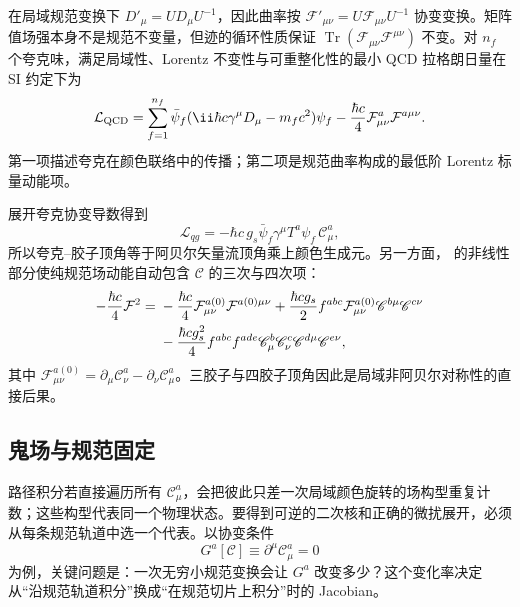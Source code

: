 在局域规范变换下 $D'_\mu=UD_\mu U^{-1}$，因此曲率按 $\mathcal F'_{\mu\nu}=U\mathcal F_{\mu\nu}U^{-1}$ 协变变换。矩阵值场强本身不是规范不变量，但迹的循环性质保证 $\operatorname{Tr}(\mathcal F_{\mu\nu}\mathcal F^{\mu\nu})$ 不变。对 $n_f$ 个夸克味，满足局域性、Lorentz 不变性与可重整化性的最小 QCD 拉格朗日量在 SI 约定下为
\begin{equation}
{
\mathcal L_{\rm QCD}
=\sum_{f=1}^{n_f}\bar\psi_f(\ii\hbar c\gamma^\mu D_\mu-m_fc^2)\psi_f
-\frac{\hbar c}{4}\mathcal F_{\mu\nu}^a\mathcal F^{a\mu\nu}.}
\label{eq:qcd-lagrangian-si-dp10}
\end{equation}
第一项描述夸克在颜色联络中的传播；第二项是规范曲率构成的最低阶 Lorentz 标量动能项。

展开夸克协变导数得到
\begin{equation}
\mathcal L_{qg}
=-\hbar c\,g_s\bar\psi_f\gamma^\mu T^a\psi_f\,\mathscr C_\mu^a,
\label{eq:qcd-quark-gluon-interaction-dp10}
\end{equation}
所以夸克--胶子顶角等于阿贝尔矢量流顶角乘上颜色生成元。另一方面， 的非线性部分使纯规范场动能自动包含 $\mathscr C$ 的三次与四次项：
\begin{align}
-\frac{\hbar c}{4}\mathcal F^2
={}&-\frac{\hbar c}{4}\mathcal F_{\mu\nu}^{a(0)}\mathcal F^{a(0)\mu\nu}
+\frac{\hbar c g_s}{2}f^{abc}\mathcal F_{\mu\nu}^{a(0)}\mathscr C^{b\mu}\mathscr C^{c\nu}\notag\\
&-\frac{\hbar c g_s^2}{4}f^{abc}f^{ade}
\mathscr C_\mu^b\mathscr C_\nu^c\mathscr C^{d\mu}\mathscr C^{e\nu},
\label{eq:yang-mills-expanded-3-4-gluon-dp10}
\end{align}
其中 $\mathcal F_{\mu\nu}^{a(0)}=\partial_\mu\mathscr C_\nu^a-\partial_\nu\mathscr C_\mu^a$。三胶子与四胶子顶角因此是局域非阿贝尔对称性的直接后果。



\subsection{鬼场与规范固定}

路径积分若直接遍历所有 $\mathscr C_\mu^a$，会把彼此只差一次局域颜色旋转的场构型重复计数；这些构型代表同一个物理状态。要得到可逆的二次核和正确的微扰展开，必须从每条规范轨道中选一个代表。以协变条件
\begin{equation*}
 G^a[\mathscr C]\equiv\partial^\mu\mathscr C_\mu^a=0
\end{equation*}
为例，关键问题是：一次无穷小规范变换会让 $G^a$ 改变多少？这个变化率决定从“沿规范轨道积分”换成“在规范切片上积分”时的 Jacobian。

